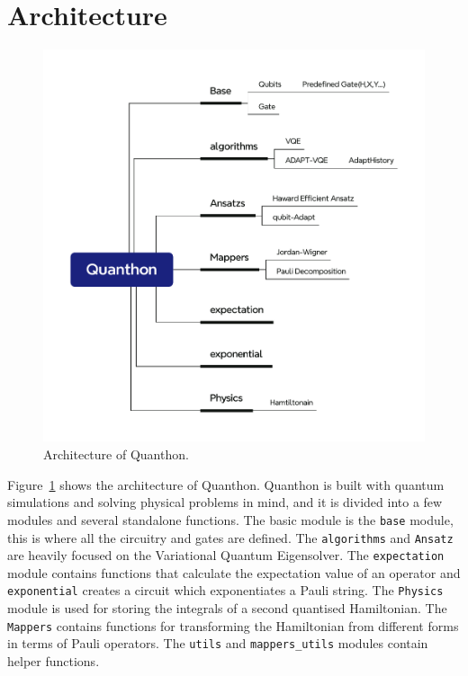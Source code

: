 \newpage

\section{Architecture}
\label{sec:arch}
\begin{figure}[ht]
	\centering
	\includegraphics[width=\textwidth]{image/architecture.pdf}
	\caption{Architecture of Quanthon.}
	\label{fig:image-architecture}
\end{figure}

Figure~\ref{fig:image-architecture} shows the architecture of Quanthon. Quanthon is built with quantum simulations and solving physical problems in mind, and it is divided into a few modules and several standalone functions. The basic module is the \texttt{base} module, this is where all the circuitry and gates are defined. The \texttt{algorithms} and \texttt{Ansatz} are heavily focused on the Variational Quantum Eigensolver. The \texttt{expectation} module contains functions that calculate the expectation value of an operator and \texttt{exponential} creates a circuit which exponentiates a Pauli string. The \texttt{Physics} module is used for storing the integrals of a second quantised Hamiltonian. The \texttt{Mappers} contains functions for transforming the Hamiltonian from different forms in terms of Pauli operators. The \texttt{utils} and \texttt{mappers\_utils} modules contain helper functions.


